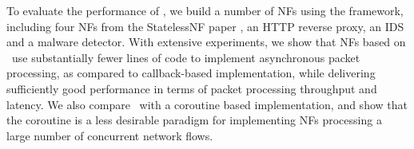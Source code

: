 


To evaluate the performance of \netstar, we build a number of NFs using the framework, including four NFs from the StatelessNF paper \cite{201545}, an HTTP reverse proxy, an IDS and a malware detector. %
With extensive experiments, we show that NFs based on \netstar~use substantially fewer lines of code to implement asynchronous packet processing, as compared to callback-based implementation, while delivering sufficiently good performance in terms of packet processing throughput and latency. We also compare \netstar~with a coroutine based implementation, and show that the coroutine is a less desirable paradigm for implementing NFs processing a large number of concurrent network flows. %

